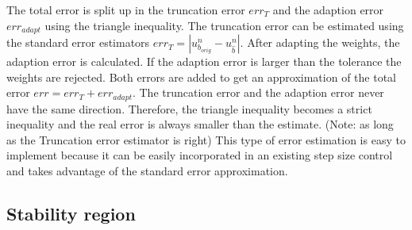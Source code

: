 \documentclass[a4paper]{article}
\numberwithin{equation}{section}
\theoremstyle{plain}
\theoremstyle{definition}
\numberwithin{theorem}{section}
\newcommand{\1}{\mathbbm{1}}
\begin{document}
The total error is split up in the truncation error $err_T$ and the adaption error $err_{adapt}$ using the triangle inequality. 
The truncation error can be estimated using the standard error estimators $err_T = | u^{n}_{b_{orig}} - u^{n}_{\hat{b}} |$. 
After adapting the weights, the adaption error is calculated. If the adaption error is larger than the tolerance the weights are rejected.  
Both errors are added to get an approximation of the total error $err = err_T + err_{adapt}$.
The truncation error and the adaption error never have the same direction.  
Therefore, the triangle inequality becomes a strict inequality and the real error is always smaller than the estimate. (Note: as long as the Truncation error estimator is right) 
This type of error estimation is easy to implement because it can be easily incorporated in an existing step size control and takes advantage of the standard error approximation.


\subsection{Stability region}
\end{document}
